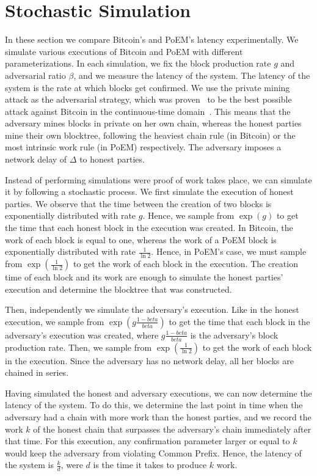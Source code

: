 \section{Stochastic Simulation}
In these section we compare Bitcoin's and PoEM's latency experimentally.
We simulate various executions of Bitcoin and PoEM with different parameterizations.
In each simulation, we fix the block production rate $g$ and adversarial ratio $\beta$, and we
measure the latency of the system.
The latency of the system is the rate at which blocks get confirmed.
We use the private mining attack as the adversarial strategy, which was
proven~\cite{eiar} to be the best possible attack against Bitcoin in the continuous-time domain~\cite{bitcoin-made-simple}.
This means that the adversary mines blocks in private on her own chain, whereas the honest parties mine
their own blocktree, following the heaviest chain rule (in Bitcoin) or the most intrinsic work rule (in PoEM) respectively.
The adversary imposes a network delay of $\Delta$ to honest parties.

Instead of performing simulations were proof of work takes place, we can simulate it by following a stochastic process.
We first simulate the execution of honest parties. We observe that the time between the creation of two blocks is
exponentially distributed with rate $g$. Hence, we sample from $\exp(g)$ to get the time that each honest block in the
execution was created. In Bitcoin, the work of each block is equal to one, whereas the work of a PoEM block is exponentially
distributed with rate $\frac{1}{\ln2}$. Hence, in PoEM's case, we must sample from $\exp(\frac{1}{\ln2})$ to get the work
of each block in the execution. The creation time of each block and its work are enough to simulate the honest parties' execution
and determine the blocktree that was constructed.

Then, independently we simulate the adversary's execution. Like in the honest execution, we sample from $\exp(g\frac{1 - beta}{beta})$
to get the time that each block in the adversary's execution was created, where $g\frac{1 - beta}{beta}$ is the adversary's block production rate.
Then, we sample from $\exp(\frac{1}{\ln2})$ to get the work of each block in the execution.
Since the adversary has no network delay, all her blocks are chained in series.

Having simulated the honest and adversary executions, we can now determine the latency of the system.
To do this, we determine the last point in time when the adversary had a chain with more work than the honest parties,
and we record the work $k$ of the honest chain that surpasses the adversary's chain immediately after that time.
For this execution, any confirmation parameter larger or equal to $k$ would keep the adversary from violating Common Prefix.
Hence, the latency of the system is $\frac{k}{d}$, were $d$ is the time it takes to produce $k$ work.